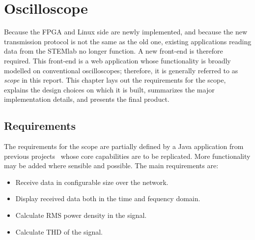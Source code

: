 %
%
\chapter{Oscilloscope} %
\label{ch:graphical_front_end}

Because the  FPGA and Linux  side are newly  implemented, and because  the new
transmission protocol  is not the same  as the old one,  existing applications
reading data from the STEMlab no longer function. A new front-end is therefore
required. This front-end is  a web application whose  functionality is broadly
modelled on conventional oscilloscopes; therefore, it is generally referred to
as \emph{scope} in this report. This chapter lays out the requirements for the
scope, explains the design choices on  which it is built, summarizes the major
implementation details, and presents the final product.

%
%
\section{Requirements} %
\label{sec:gui:requirements}

The requirements  for the scope  are partially  defined by a  Java application
from  previous projects~\cite{gut:specky}  whose core  capabilities are  to be
replicated. More functionality  may be added where  sensible and possible. The
main requirements are:
\begin{itemize}\tightlist
    \item Receive data in configurable size over the network.
    \item Display received data both in the time and fequency domain.
    \item Calculate RMS power density in the signal.
    \item Calculate THD of the signal.
\end{itemize}
%
%
